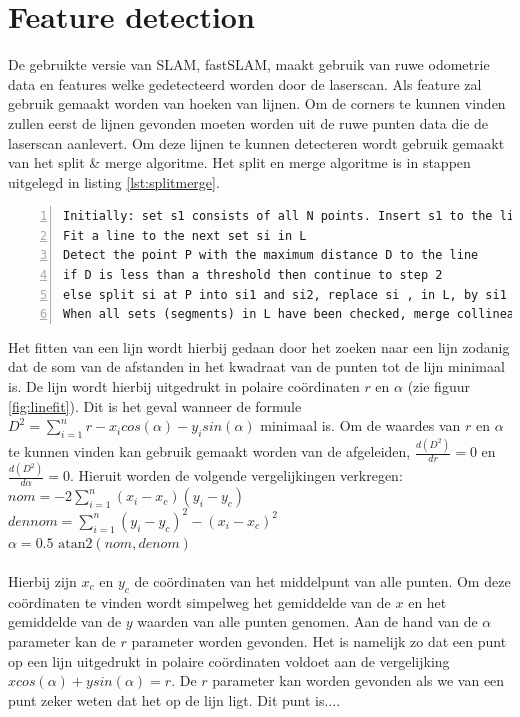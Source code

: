 \documentclass[a4paper]{article}
\begin{document}
\section{Feature detection}
\label{sec:featdetc}
De gebruikte versie van SLAM, fastSLAM, maakt gebruik van ruwe odometrie data en features welke gedetecteerd worden door de laserscan.
Als feature zal gebruik gemaakt worden van hoeken van lijnen. Om de corners te kunnen vinden zullen eerst de lijnen gevonden moeten worden uit de ruwe punten data die de laserscan aanlevert. Om deze lijnen te kunnen detecteren wordt gebruik gemaakt van het split \& merge algoritme. Het split en merge algoritme is in stappen uitgelegd in listing \ref{lst:splitmerge}.

\begin{lstlisting}[caption= Split \& merge algorithm, label=lst:splitmerge, numbers=left]
Initially: set s1 consists of all N points. Insert s1 to the list L. Set index i=1
Fit a line to the next set si in L
Detect the point P with the maximum distance D to the line
if D is less than a threshold then continue to step 2
else split si at P into si1 and si2, replace si , in L, by si1 and si2. Continue to step 2
When all sets (segments) in L have been checked, merge collinear segments.
\end{lstlisting}

\noindent Het fitten van een lijn wordt hierbij gedaan door het zoeken naar een lijn zodanig dat de som van de afstanden in het kwadraat van de punten tot de lijn minimaal is. De lijn wordt hierbij uitgedrukt in polaire co\"ordinaten $r$ en $\alpha$ (zie figuur \ref{fig:linefit}). 
Dit is het geval wanneer de formule $D^2 = \sum\limits_{i=1}^n r-x_i cos(\alpha) - y_i sin(\alpha)$ minimaal is. Om de waardes van $r$ en $\alpha$ te kunnen vinden kan gebruik gemaakt worden van de afgeleiden, $\frac{d(D^2)}{dr} = 0$ en $\frac{d(D^2)}{d\alpha} = 0$.
Hieruit worden de volgende vergelijkingen verkregen:\\
$nom =  -2\sum\limits_{i=1}^n (x_i - x_c)(y_i - y_c)$\\
$dennom =  \sum\limits_{i=1}^n (y_i - y_c)^2 - (x_i - x_c)^2$\\
$\alpha = 0.5\mbox{ atan2}(nom, denom)$\\\\
Hierbij zijn $x_c$ en $y_c$ de co\"ordinaten van het middelpunt van alle punten. Om deze co\"ordinaten te vinden wordt simpelweg het gemiddelde van de $x$ en het gemiddelde van de $y$ waarden van alle punten genomen. Aan de hand van de $\alpha$ parameter kan de $r$ parameter worden gevonden.
Het is namelijk zo dat een punt op een lijn uitgedrukt in polaire co\"ordinaten voldoet aan de vergelijking $x cos(\alpha) + y sin(\alpha) = r$. De $r$ parameter kan worden gevonden als we van een punt zeker weten dat het op de lijn ligt. Dit punt is....
\end{document}
